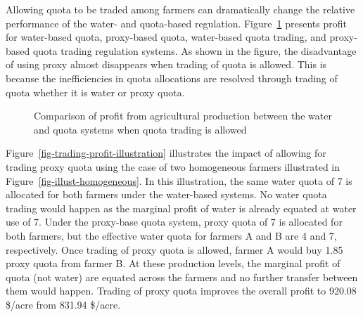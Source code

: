 \documentclass[
  letterpaper,
  DIV=11,
  numbers=noendperiod]{scrartcl}
\begin{document}
Allowing quota to be traded among farmers can dramatically change the
relative performance of the water- and quota-based regulation.
Figure~\ref{fig-trading-profit} presents profit for water-based quota,
proxy-based quota, water-based quota trading, and proxy-based quota
trading regulation systems. As shown in the figure, the disadvantage of
using proxy almost disappears when trading of quota is allowed. This is
because the inefficiencies in quota allocations are resolved through
trading of quota whether it is water or proxy quota.

\begin{figure}[H]


\caption{\label{fig-trading-profit}Comparison of profit from
agricultural production between the water and quota systems when quota
trading is allowed}

\end{figure}%

Figure~\ref{fig-trading-profit-illustration} illustrates the impact of
allowing for trading proxy quota using the case of two homogeneous
farmers illustrated in Figure~\ref{fig-illust-homogeneous}. In this
illustration, the same water quota of 7 is allocated for both farmers
under the water-based systems. No water quota trading would happen as
the marginal profit of water is already equated at water use of 7. Under
the proxy-base quota system, proxy quota of 7 is allocated for both
farmers, but the effective water quota for farmers A and B are 4 and 7,
respectively. Once trading of proxy quota is allowed, farmer A would buy
1.85 proxy quota from farmer B. At these production levels, the marginal
profit of quota (not water) are equated across the farmers and no
further transfer between them would happen. Trading of proxy quota
improves the overall profit to 920.08 \$/acre from 831.94 \$/acre.
\end{document}
